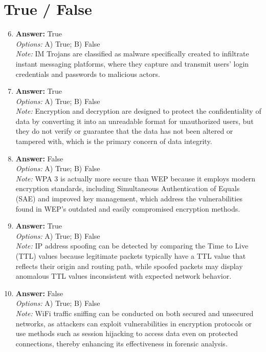 \documentclass[12pt]{article}
\begin{document}
\section*{True / False}
\begin{enumerate}[label=\arabic*.]
\setcounter{enumi}{5}
\item \textbf{Answer:} True
\\ \textit{Options:} A) True; B) False
\\ \textit{Note:} IM Trojans are classified as malware specifically created to infiltrate instant messaging platforms, where they capture and transmit users' login credentials and passwords to malicious actors.
\item \textbf{Answer:} True
\\ \textit{Options:} A) True; B) False
\\ \textit{Note:} Encryption and decryption are designed to protect the confidentiality of data by converting it into an unreadable format for unauthorized users, but they do not verify or guarantee that the data has not been altered or tampered with, which is the primary concern of data integrity.
\item \textbf{Answer:} False
\\ \textit{Options:} A) True; B) False
\\ \textit{Note:} WPA 3 is actually more secure than WEP because it employs modern encryption standards, including Simultaneous Authentication of Equals (SAE) and improved key management, which address the vulnerabilities found in WEP's outdated and easily compromised encryption methods.
\item \textbf{Answer:} True
\\ \textit{Options:} A) True; B) False
\\ \textit{Note:} IP address spoofing can be detected by comparing the Time to Live (TTL) values because legitimate packets typically have a TTL value that reflects their origin and routing path, while spoofed packets may display anomalous TTL values inconsistent with expected network behavior.
\item \textbf{Answer:} False
\\ \textit{Options:} A) True; B) False
\\ \textit{Note:} WiFi traffic sniffing can be conducted on both secured and unsecured networks, as attackers can exploit vulnerabilities in encryption protocols or use methods such as session hijacking to access data even on protected connections, thereby enhancing its effectiveness in forensic analysis.
\end{enumerate}
\end{document}
